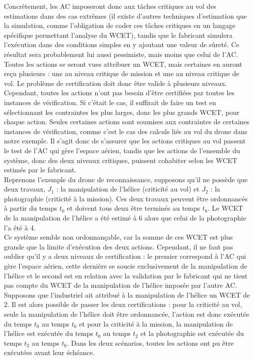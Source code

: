 \documentclass[12pt,a4paper,oneside]{book}
\theoremstyle{break}
\theoremstyle{breakplain}
\begin{document}
Concrètement, les AC imposeront donc aux tâches critiques au vol des estimations dans des cas extrêmes (il existe d'autres techniques d'estimation que la simulation, comme l'obligation de coder ces tâches critiques en un langage spécifique permettant l'analyse du WCET), tandis que le fabricant simulera l'exécution dans des conditions simples en y ajoutant une valeur de sûreté. Ce résultat sera probablement lui aussi pessimiste, mais moins que celui de l'AC.\\

Toutes les actions se seront vues attribuer un WCET, mais certaines en auront reçu plusieurs : une au niveau critique de mission et une au niveau critique de vol. Le problème de certification doit donc être valide à plusieurs niveaux. Cependant, toutes les actions n'ont pas besoin d'être certifiées par toutes les instances de vérification. Si c'était le cas, il suffirait de faire un test en sélectionnant les contraintes les plus larges, donc les plus grands WCET, pour chaque action. Seules certaines actions sont soumises aux contraintes de certaines instances de vérification, comme c'est le cas des calculs liés au vol du drone dans notre exemple. Il s'agit donc de s'assurer que les actions critiques au vol passent le test de l'AC qui gère l'espace aérien, tandis que les actions de l'ensemble du système, donc des deux niveaux critiques, puissent cohabiter selon les WCET estimés par le fabricant.\\

Reprenons l'exemple du drone de reconnaissance, supposons qu'il ne possède que deux travaux, $J_1$ : la manipulation de l'hélice (criticité au vol) et  $J_2$ : la photographie (criticité à la mission). Ces deux travaux peuvent être ordonnancés à partir du temps $t_0$ et doivent tous deux être terminés au temps $t_8$. Le WCET de la manipulation de l'hélice a été estimé à 6 alors que celui de la photographie l'a été à 4.\\

Ce système semble non ordonnançable, car la somme de ces WCET est plus grande que la limite d'exécution des deux actions. Cependant, il ne faut pas oublier qu'il y a deux niveaux de certification : le premier correspond à l'AC qui gère l'espace aérien, cette dernière se soucie exclusivement de la manipulation de l'hélice et le second est en relation avec la validation par le fabricant qui ne tient pas compte du WCET de la manipulation de l'hélice imposée par l'autre AC.\\
Supposons que l'industriel ait attribué à la manipulation de l'hélice un WCET de 2. Il est alors possible de passer les deux certifications : pour la criticité au vol, seule la manipulation de l'hélice doit être ordonnancée, l'action est donc exécutée du temps $t_0$ au temps $t_6$ et pour la criticité à la mission, la manipulation de l'hélice est exécutée du temps $t_0$ au temps $t_2$ et la photographie est exécutée du temps $t_2$ au temps $t_6$. Dans les deux scénarios, toutes les actions ont pu être exécutées avant leur échéance.\\
\end{document}
